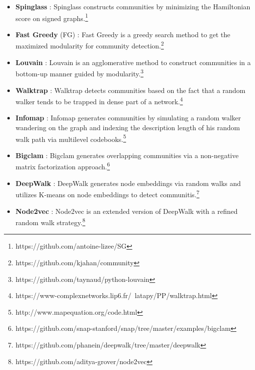 \begin{itemize}
	\item \textbf{Spinglass} \cite{eaton2012spin}: Spinglass  constructs communities by minimizing the Hamiltonian score on signed graphs.\footnote{https://github.com/antoine-lizee/SG}
	\item \textbf{Fast Greedy} (FG) \cite{clauset2004finding}: Fast Greedy  is a greedy search method to get the maximized modularity for community detection.\footnote{https://github.com/kjahan/community}
	\item \textbf{Louvain} \cite{blondel2008fast}: Louvain  is an agglomerative method to construct communities in a bottom-up manner guided by modularity.\footnote{https://github.com/taynaud/python-louvain}
	\item \textbf{Walktrap} \cite{pons2005computing}: Walktrap detects communities based on the fact that a random walker tends to be trapped in dense part of a network.\footnote{https://www-complexnetworks.lip6.fr/~latapy/PP/walktrap.html}
	\item \textbf{Infomap} \cite{rosvall2011multilevel}: Infomap generates communities by simulating a random walker wandering on the graph and indexing the description length of his random walk path via multilevel codebooks.\footnote{http://www.mapequation.org/code.html}
	\item \textbf{Bigclam} \cite{yang2013overlapping}: Bigclam generates overlapping communities via a non-negative matrix factorization approach.\footnote{https://github.com/snap-stanford/snap/tree/master/examples/bigclam}
	\item \textbf{DeepWalk} \cite{perozzi2014deepwalk}: DeepWalk generates node embeddings via random walks and utilizes K-means on node embeddings to detect communitis.\footnote{https://github.com/phanein/deepwalk/tree/master/deepwalk}
	\item \textbf{Node2vec} \cite{grover2016node2vec}: Node2vec is an extended version of DeepWalk with a refined random walk strategy.\footnote{https://github.com/aditya-grover/node2vec}
\end{itemize}

